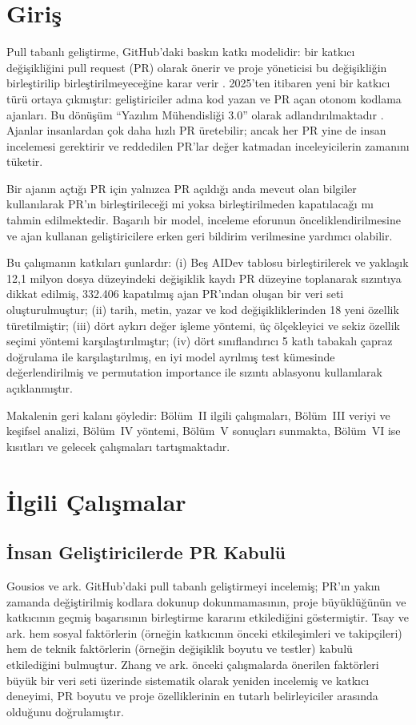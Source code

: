 \documentclass[conference]{IEEEtran}
\begin{document}
\section{Giriş}
Pull tabanlı geliştirme, GitHub'daki baskın katkı modelidir: bir katkıcı değişikliğini pull request (PR) olarak önerir ve proje yöneticisi bu değişikliğin birleştirilip birleştirilmeyeceğine karar verir \cite{gousios2014exploratory}. 2025'ten itibaren yeni bir katkıcı türü ortaya çıkmıştır: geliştiriciler adına kod yazan ve PR açan otonom kodlama ajanları. Bu dönüşüm ``Yazılım Mühendisliği 3.0'' olarak adlandırılmaktadır \cite{li2025rise}. Ajanlar insanlardan çok daha hızlı PR üretebilir; ancak her PR yine de insan incelemesi gerektirir ve reddedilen PR'lar değer katmadan inceleyicilerin zamanını tüketir.

Bir ajanın açtığı PR için yalnızca PR açıldığı anda mevcut olan bilgiler kullanılarak PR'ın birleştirileceği mi yoksa birleştirilmeden kapatılacağı mı tahmin edilmektedir. Başarılı bir model, inceleme eforunun önceliklendirilmesine ve ajan kullanan geliştiricilere erken geri bildirim verilmesine yardımcı olabilir.

Bu çalışmanın katkıları şunlardır: (i) Beş AIDev tablosu birleştirilerek ve yaklaşık 12,1 milyon dosya düzeyindeki değişiklik kaydı PR düzeyine toplanarak sızıntıya dikkat edilmiş, 332.406 kapatılmış ajan PR'ından oluşan bir veri seti oluşturulmuştur; (ii) tarih, metin, yazar ve kod değişikliklerinden 18 yeni özellik türetilmiştir; (iii) dört aykırı değer işleme yöntemi, üç ölçekleyici ve sekiz özellik seçimi yöntemi karşılaştırılmıştır; (iv) dört sınıflandırıcı 5 katlı tabakalı çapraz doğrulama ile karşılaştırılmış, en iyi model ayrılmış test kümesinde değerlendirilmiş ve permutation importance ile sızıntı ablasyonu kullanılarak açıklanmıştır.

Makalenin geri kalanı şöyledir: Bölüm~II ilgili çalışmaları, Bölüm~III veriyi ve keşifsel analizi, Bölüm~IV yöntemi, Bölüm~V sonuçları sunmakta, Bölüm~VI ise kısıtları ve gelecek çalışmaları tartışmaktadır.

\section{İlgili Çalışmalar}
\subsection{İnsan Geliştiricilerde PR Kabulü}
Gousios ve ark. \cite{gousios2014exploratory} GitHub'daki pull tabanlı geliştirmeyi incelemiş; PR'ın yakın zamanda değiştirilmiş kodlara dokunup dokunmamasının, proje büyüklüğünün ve katkıcının geçmiş başarısının birleştirme kararını etkilediğini göstermiştir. Tsay ve ark. \cite{tsay2014influence} hem sosyal faktörlerin (örneğin katkıcının önceki etkileşimleri ve takipçileri) hem de teknik faktörlerin (örneğin değişiklik boyutu ve testler) kabulü etkilediğini bulmuştur. Zhang ve ark. \cite{zhang2022pull} önceki çalışmalarda önerilen faktörleri büyük bir veri seti üzerinde sistematik olarak yeniden incelemiş ve katkıcı deneyimi, PR boyutu ve proje özelliklerinin en tutarlı belirleyiciler arasında olduğunu doğrulamıştır.
\end{document}
